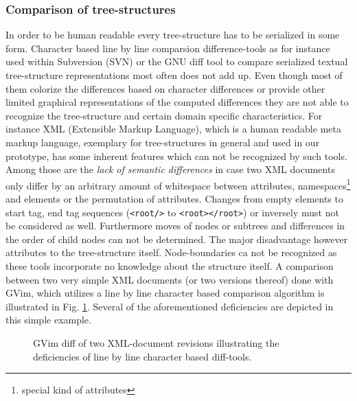 \subsubsection{Comparison of tree-structures}
In order to be human readable every tree-structure has to be serialized in some form. Character based line by line comparsion difference-tools as for instance used within Subversion (SVN) or the GNU diff tool to compare serialized textual tree-structure representations most often %
does not add up. Even though most of them colorize the differences based on character differences or provide other limited graphical representations of the computed differences they are not able to recognize the tree-structure and certain domain specific characteristics. For instance XML (Extensible Markup Language), which is a human readable meta markup language, exemplary for tree-structures in general and used in our prototype, has some inherent features which can not be recognized by such tools. Among those are the \emph{lack of semantic differences} in case two XML documents only differ by an arbitrary amount of whitespace between attributes, namespaces\footnote{special kind of attributes} and elements or the permutation of attributes. Changes from empty elements to start tag, end tag sequences (\texttt{<root/>} to \texttt{<root></root>}) or inversely must not be considered as well. Furthermore moves of nodes or subtrees and differences in the order of child nodes can not be determined. The major disadvantage however attributes to the tree-structure itself. Node-boundaries ca not be recognized as these tools incorporate no knowledge about the structure itself. A comparison between two very simple XML documents (or two versions thereof) done with GVim, which utilizes a line by line character based comparison algorithm is illustrated in Fig. \ref{fig:faileddiff}. Several of the aforementioned deficiencies are depicted in this simple example. 

\begin{figure}[tb]
\caption{\label{fig:faileddiff} GVim diff of two XML-document revisions illustrating the deficiencies of line by line character based diff-tools.}
\end{figure}

